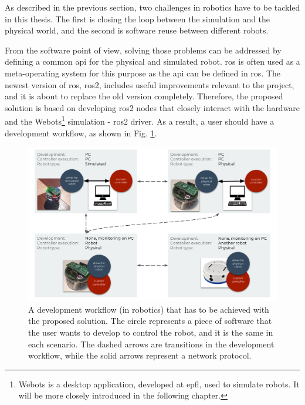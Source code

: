 As described in the previous section, two challenges in robotics have to be tackled in this thesis.
The first is closing the loop between the simulation and the physical world, and the second is software reuse between different robots.


From the software point of view, solving those problems can be addressed by defining a common \ac{api} for the physical and simulated robot.
\ac{ros} is often used as a meta-operating system for this purpose as the \ac{api} can be defined in \ac{ros}.
The newest version of \ac{ros}, \ac{ros2}, includes useful improvements relevant to the project, and it is about to replace the old version completely.
Therefore, the proposed solution is based on developing \ac{ros2} nodes that closely interact with the hardware and the Webots\footnote{Webots is a desktop application, developed at \ac{epfl}, used to simulate robots.
It will be more closely introduced in the following chapter.} simulation - \ac{ros2} driver.
As a result, a user should have a development workflow, as shown in Fig. \ref{fig:introduction:desired_workflow}.

\begin{figure}[H]
    \centering
    \includegraphics[width=\textwidth]{introduction/figures/desired_workflow.pdf}
    \caption[A development workflow (in robotics) that has to be achieved with the proposed solution]{
        A development workflow (in robotics) that has to be achieved with the proposed solution.
        The circle represents a piece of software that the user wants to develop to control the robot, and it is the same in each scenario.
        The dashed arrows are transitions in the development workflow, while the solid arrows represent a network protocol.
    }
    \label{fig:introduction:desired_workflow}
\end{figure}

